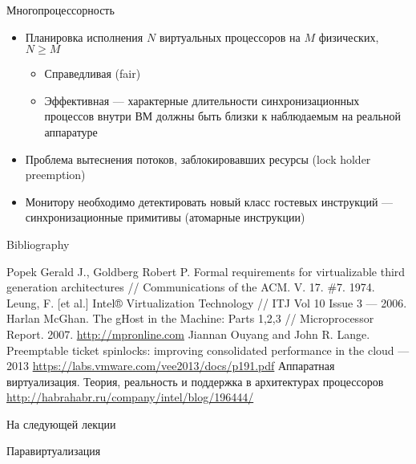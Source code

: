 \begin{frame}{Многопроцессорность}
\begin{itemize}
    \item Планировка исполнения $N$ виртуальных процессоров на $M$ физических, $N \geqslant M$
    \begin{itemize}
        \item Справедливая (fair)
        \item Эффективная — характерные длительности синхронизационных процессов внутри ВМ должны быть близки к наблюдаемым на реальной аппаратуре
    \end{itemize}
\end{itemize}

\begin{itemize}
    \item Проблема вытеснения потоков, заблокировавших ресурсы (lock holder preemption)
    \item Монитору необходимо детектировать новый класс гостевых инструкций — синхронизационные примитивы (атомарные инструкции)
\end{itemize}

\end{frame}

\begin{frame}[allowframebreaks]{Bibliography}
\begin{thebibliography}{99}
 Popek Gerald J., Goldberg Robert P. Formal requirements for virtualizable third generation architectures // Communications of the ACM. V. 17. \#7. 1974.
 Leung, F. [et al.] Intel® Virtualization Technology // ITJ Vol 10 Issue 3 — 2006.
 Harlan McGhan. The gHost in the Machine: Parts 1,2,3 // Microprocessor Report. 2007. \url{http://mpronline.com}
 Jiannan Ouyang and John R. Lange. Preemptable ticket spinlocks: improving consolidated performance in the cloud — 2013 \url{https://labs.vmware.com/vee2013/docs/p191.pdf}
 Аппаратная виртуализация. Теория, реальность и поддержка в архитектурах процессоров \url{http://habrahabr.ru/company/intel/blog/196444/}
\end{thebibliography}
\end{frame}

\begin{frame}{На следующей лекции}
\centering

Паравиртуализация

\end{frame}

\finalslide


